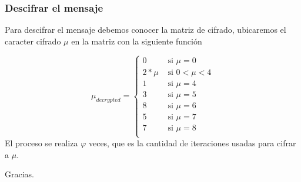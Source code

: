 \documentclass[dvipdfm]{beamer}
\begin{document}
\begin{frame}
\frametitle{Descifrar el mensaje}
Para descifrar el mensaje debemos conocer la matriz de cifrado, ubicaremos el caracter cifrado $\mu$ en la matriz con la siguiente funci\'on

\[ \mu_{decrypted} = 
\begin{cases} 
	0 	& \text { si } \mu = 0 \\ 
	2*\mu 	& \text { si } 0 < \mu < 4 \\
	1 	& \text { si } \mu = 4 \\
	3 	& \text { si } \mu = 5 \\
	8	& \text { si } \mu = 6 \\
	5 	& \text { si } \mu = 7 \\
	7	& \text { si } \mu = 8 \\
\end{cases} 
\] 
El proceso se realiza $\varphi$ veces, que es la cantidad de iteraciones usadas para cifrar a $\mu$. 

\end{frame}


\begin{frame}
 Gracias.
\end{frame}
\end{document}
